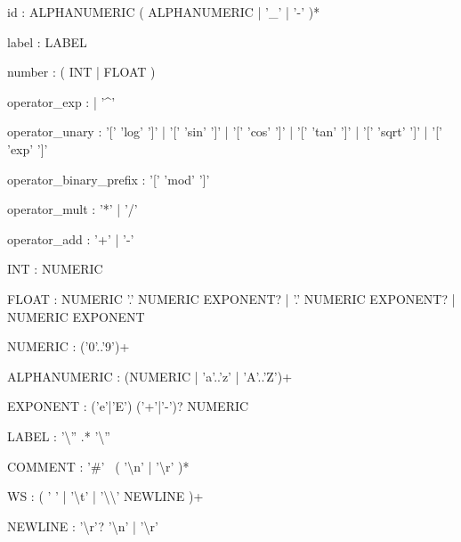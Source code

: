 \begin{bnfsource}
id :
  ALPHANUMERIC ( ALPHANUMERIC | '_' | '-' )*

label :
  LABEL

number :
  ( INT | FLOAT )
  

operator_exp :
  | '^'

operator_unary :
  '[' 'log' ']'
  | '[' 'sin' ']'
  | '[' 'cos' ']'
  | '[' 'tan' ']'
  | '[' 'sqrt' ']'
  | '[' 'exp' ']'

operator_binary_prefix :
  '[' 'mod' ']'

operator_mult :
  '*' | '/'

operator_add :
  '+' | '-'


INT :
  NUMERIC

FLOAT :
  NUMERIC '.' NUMERIC EXPONENT?
  | '.' NUMERIC EXPONENT?
  | NUMERIC EXPONENT

NUMERIC :
  ('0'..'9')+
  
ALPHANUMERIC :
  (NUMERIC | 'a'..'z' | 'A'..'Z')+
  
EXPONENT :
  ('e'|'E') ('+'|'-')? NUMERIC

LABEL :
  '{\textbackslash}'' .* '{\textbackslash}''

COMMENT :
  '#' ~( '{\textbackslash}n' | '{\textbackslash}r' )*

WS :
  ( ' ' | '{\textbackslash}t' | '{\textbackslash}{\textbackslash}' NEWLINE )+

NEWLINE :
  '{\textbackslash}r'? '{\textbackslash}n' | '{\textbackslash}r'

\end{bnfsource}

